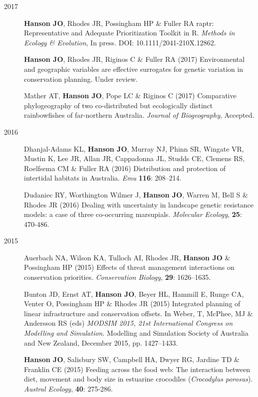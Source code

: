 \documentclass[12pt,a4paper]{article}
\begin{document}
\begin{description}

\item[2017] \textbf{Hanson JO}, Rhodes JR, Possingham HP \& Fuller RA raptr: Representative and Adequate Prioritization Toolkit in R. \textit{Methods in Ecology \& Evolution}, In press. DOI: 10.1111/2041-210X.12862.

\item[] \textbf{Hanson JO}, Rhodes JR, Riginos C \& Fuller RA (2017) Environmental and geographic variables are effective surrogates for genetic variation in conservation planning. Under review.

\item[] Mather AT, \textbf{Hanson JO}, Pope LC \& Riginos C (2017) Comparative phylogeography of two co-distributed but ecologically distinct rainbowfishes of far-northern Australia. \textit{Journal of Biogeography}, Accepted.

\item[2016] Dhanjal-Adams KL, \textbf{Hanson JO}, Murray NJ, Phinn SR, Wingate VR, Mustin K, Lee JR, Allan JR, Cappadonna JL, Studds CE, Clemens RS, Roelfsema CM \& Fuller RA (2016) Distribution and protection of intertidal habitats in Australia. \textit{Emu} \textbf{116}: 208--214.

\item[] Dudaniec RY, Worthington Wilmer J, \textbf{Hanson JO}, Warren M, Bell S \& Rhodes JR (2016) Dealing with uncertainty in landscape genetic resistance models: a case of three co-occurring marsupials. \textit{Molecular Ecology}, \textbf{25}: 470-486.

\item[2015] Auerbach NA, Wilson KA, Tulloch AI, Rhodes JR, \textbf{Hanson JO} \& Possingham HP (2015) Effects of threat management interactions on conservation priorities. \textit{Conservation Biology}, \textbf{29}: 1626--1635.

\item[] Bunton JD, Ernst AT, \textbf{Hanson JO}, Beyer HL, Hammill E, Runge CA, Venter O, Possingham HP \& Rhodes JR (2015) Integrated planning of linear infrastructure and conservation offsets. In Weber, T, McPhee, MJ \& Andersson RS (eds) \textit{MODSIM 2015, 21st International Congress on Modelling and Simulation}. Modelling and Simulation Society of Australia and New Zealand, December 2015, pp. 1427--1433.

\item[] \textbf{Hanson JO}, Salisbury SW, Campbell HA, Dwyer RG, Jardine TD \& Franklin CE (2015) Feeding across the food web: The interaction between diet, movement and body size in estuarine crocodiles (\textit{Crocodylus porosus}). \textit{Austral Ecology}, \textbf{40}: 275-286.


\end{description}
\end{document}
